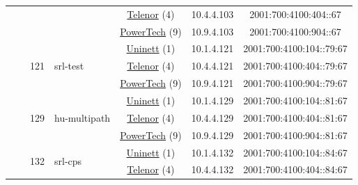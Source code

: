 \begin{small}
\begin{center}
\begin{longtable}{|c|c|c|c|c|c|c|c|}
  &  & \multicolumn{2}{|c|}{} & \multicolumn{2}{|c|}{\tiny{\href{https://www.telenor.no}{Telenor} (4)}} & \tiny{10.4.4.103} & \tiny{2001:700:4100:404::67} \\* \cline{5-5}\cline{6-6}\cline{7-7}\cline{8-8}
  &  & \multicolumn{2}{|c|}{} & \multicolumn{2}{|c|}{\tiny{\href{http://www.powertech.no}{PowerTech} (9)}} & \tiny{10.9.4.103} & \tiny{2001:700:4100:904::67} \\* \cline{3-3}\cline{4-4}\cline{5-5}\cline{6-6}\cline{7-7}\cline{8-8}
  &  & \multirow{3}{*}{\tiny{121}} & \multicolumn{1}{|l|}{\multirow{3}{*}{\tiny{srl-test}}} & \multicolumn{2}{|c|}{\tiny{\href{https://www.uninett.no}{Uninett} (1)}} & \tiny{10.1.4.121} & \tiny{2001:700:4100:104::79:67} \\* \cline{5-5}\cline{6-6}\cline{7-7}\cline{8-8}
  &  &  &  & \multicolumn{2}{|c|}{\tiny{\href{https://www.telenor.no}{Telenor} (4)}} & \tiny{10.4.4.121} & \tiny{2001:700:4100:404::79:67} \\* \cline{5-5}\cline{6-6}\cline{7-7}\cline{8-8}
  &  &  &  & \multicolumn{2}{|c|}{\tiny{\href{http://www.powertech.no}{PowerTech} (9)}} & \tiny{10.9.4.121} & \tiny{2001:700:4100:904::79:67} \\* \cline{3-3}\cline{4-4}\cline{5-5}\cline{6-6}\cline{7-7}\cline{8-8}
  &  & \multirow{3}{*}{\tiny{129}} & \multicolumn{1}{|l|}{\multirow{3}{*}{\tiny{hu-multipath}}} & \multicolumn{2}{|c|}{\tiny{\href{https://www.uninett.no}{Uninett} (1)}} & \tiny{10.1.4.129} & \tiny{2001:700:4100:104::81:67} \\* \cline{5-5}\cline{6-6}\cline{7-7}\cline{8-8}
  &  &  &  & \multicolumn{2}{|c|}{\tiny{\href{https://www.telenor.no}{Telenor} (4)}} & \tiny{10.4.4.129} & \tiny{2001:700:4100:404::81:67} \\* \cline{5-5}\cline{6-6}\cline{7-7}\cline{8-8}
  &  &  &  & \multicolumn{2}{|c|}{\tiny{\href{http://www.powertech.no}{PowerTech} (9)}} & \tiny{10.9.4.129} & \tiny{2001:700:4100:904::81:67} \\* \cline{3-3}\cline{4-4}\cline{5-5}\cline{6-6}\cline{7-7}\cline{8-8}
  &  & \multirow{3}{*}{\tiny{132}} & \multicolumn{1}{|l|}{\multirow{3}{*}{\tiny{srl-cps}}} & \multicolumn{2}{|c|}{\tiny{\href{https://www.uninett.no}{Uninett} (1)}} & \tiny{10.1.4.132} & \tiny{2001:700:4100:104::84:67} \\* \cline{5-5}\cline{6-6}\cline{7-7}\cline{8-8}
  &  &  &  & \multicolumn{2}{|c|}{\tiny{\href{https://www.telenor.no}{Telenor} (4)}} & \tiny{10.4.4.132} & \tiny{2001:700:4100:404::84:67} \\* \cline{5-5}\cline{6-6}\cline{7-7}\cline{8-8}

\end{longtable}
\end{center}
\end{small}
